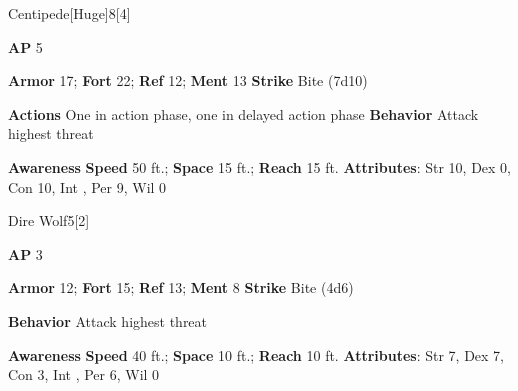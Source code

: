 \begin{monsection}{Centipede}[Huge]{8}[4]
\vspace{-1em}\vspace{-1em}
\begin{spellcontent}
\begin{spelltargetinginfo}
{\textbf{AP} 5}

\pari \textbf{Armor} 17;
\textbf{Fort} 22;
\textbf{Ref} 12;
\textbf{Ment} 13
\pari \textbf{Strike} Bite  (7d10)


\pari \textbf{Actions} One in action phase, one in delayed action phase
\pari \textbf{Behavior} Attack highest threat
\end{spelltargetinginfo}
\end{spellcontent}

\begin{monsterfooter}
\pari \textbf{Awareness} 
\pari \textbf{Speed} 50 ft.;
\textbf{Space} 15 ft.;
\textbf{Reach} 15 ft.
\pari \textbf{Attributes}:
Str 10,
Dex 0,
Con 10,
Int ,
Per 9,
Wil 0
\end{monsterfooter}
\end{monsection}

\begin{monsection}{Dire Wolf}{5}[2]
\vspace{-1em}\vspace{-1em}
\begin{spellcontent}
\begin{spelltargetinginfo}
{\textbf{AP} 3}

\pari \textbf{Armor} 12;
\textbf{Fort} 15;
\textbf{Ref} 13;
\textbf{Ment} 8
\pari \textbf{Strike} Bite  (4d6)



\pari \textbf{Behavior} Attack highest threat
\end{spelltargetinginfo}
\end{spellcontent}

\begin{monsterfooter}
\pari \textbf{Awareness} 
\pari \textbf{Speed} 40 ft.;
\textbf{Space} 10 ft.;
\textbf{Reach} 10 ft.
\pari \textbf{Attributes}:
Str 7,
Dex 7,
Con 3,
Int ,
Per 6,
Wil 0
\end{monsterfooter}
\end{monsection}


